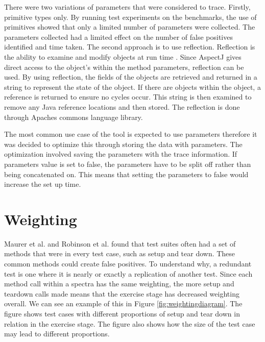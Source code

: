 There were two variations of parameters that were considered to trace. Firstly, primitive types only. By running test experiments on the benchmarks, the use of primitives showed that only a limited number of parameters were collected. The parameters collected had a limited effect on the number of false positives identified and time taken. The second approach is to use reflection. Reflection is the ability to examine and modify objects at run time \cite{oraclereflection}. Since AspectJ gives direct access to the object's within the method parameters, reflection can be used. By using reflection, the fields of the objects are retrieved and returned in a string to represent the state of the object. If there are objects within the object, a reference is returned to ensure no cycles occur. This string is then examined to remove any Java reference locations and then stored. The reflection is done through Apaches commons language library.

The most common use case of the tool is expected to use parameters therefore it was decided to optimize this through storing the data with parameters. The optimization involved saving the parameters with the trace information. If parameters value is set to false, the parameters have to be split off rather than being concatenated on. This means that setting the parameters to false would increase the set up time.

\section{Weighting }
Maurer et al. \cite{koochakzadeh2009test} and Robinson et al. \cite{li2008static} found that test suites often had a set of methods that were in every test case, such as setup and tear down. These common methods could create false positives. To understand why, a redundant test is one where it is nearly or exactly a replication of another test. Since each method call within a spectra has the same weighting, the more setup and teardown calls made means that the exercise stage has decreased weighting overall. We can see an example of this in Figure \ref{fig:weightingdiagram}. The figure shows test cases with different proportions of setup and tear down in relation in the exercise stage. The figure also shows how the size of the test case may lead to different proportions.

